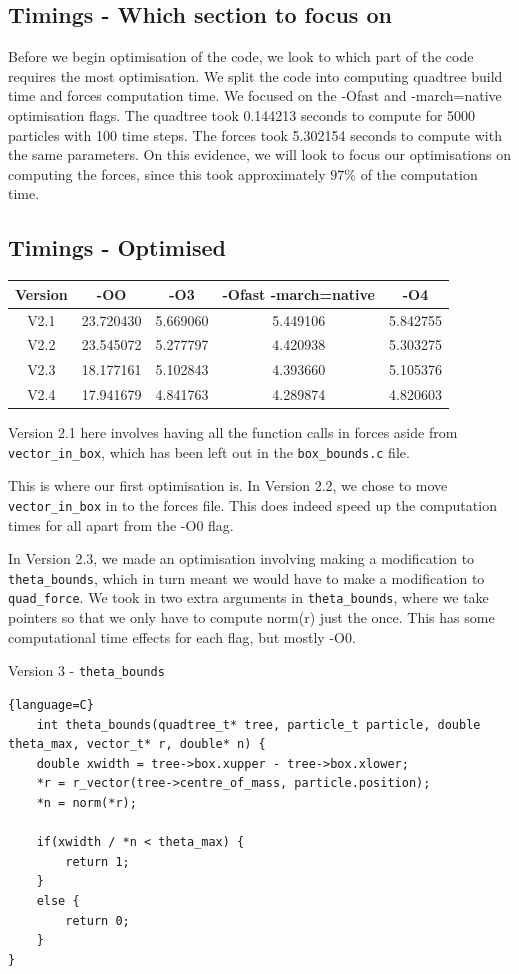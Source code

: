 \subsection{Timings - Which section to focus on}
Before we begin optimisation of the code, we look to which part of the code requires the most optimisation. We split the code into computing quadtree build time and forces computation time. We focused on the -Ofast and -march=native optimisation flags. The quadtree took 0.144213 seconds to compute for 5000 particles with 100 time steps. The forces took 5.302154 seconds to compute with the same parameters. On this evidence, we will look to focus our optimisations on computing the forces, since this took approximately $97\%$ of the computation time.
\subsection{Timings - Optimised}
\begin{center}
    \begin{tabular}{|c|c|c|c|c|}
        \hline
        Version & -OO & -O3 & -Ofast -march=native & -O4\\
        \hline
        V2.1 & 23.720430 & 5.669060 & 5.449106 & 5.842755\\
        \hline
        V2.2 & 23.545072 & 5.277797 & 4.420938 & 5.303275\\
        \hline
        V2.3 & 18.177161 & 5.102843 & 4.393660 & 5.105376\\
        \hline
        V2.4 & 17.941679 & 4.841763 & 4.289874 & 4.820603\\
        \hline
    \end{tabular}
\end{center}
Version 2.1 here involves having all the function calls in forces aside from \verb|vector_in_box|, which has been left out in the \verb|box_bounds.c| file.

This is where our first optimisation is. In Version 2.2, we chose to move \verb|vector_in_box| in to the forces file. This does indeed speed up the computation times for all apart from the -O0 flag.

In Version 2.3, we made an optimisation involving making a modification to \verb|theta_bounds|, which in turn meant we would have to make a modification to \verb|quad_force|. We took in two extra arguments in \verb|theta_bounds|, where we take pointers so that we only have to compute norm(r) just the once. This has some computational time effects for each flag, but mostly -O0.
\begin{center}
    Version 3 - \verb|theta_bounds|
\end{center}
\begin{lstlisting}{language=C}
    int theta_bounds(quadtree_t* tree, particle_t particle, double theta_max, vector_t* r, double* n) {
    double xwidth = tree->box.xupper - tree->box.xlower;
    *r = r_vector(tree->centre_of_mass, particle.position);
    *n = norm(*r);

    if(xwidth / *n < theta_max) {
        return 1;
    }
    else {
        return 0;
    }
}
\end{lstlisting}

